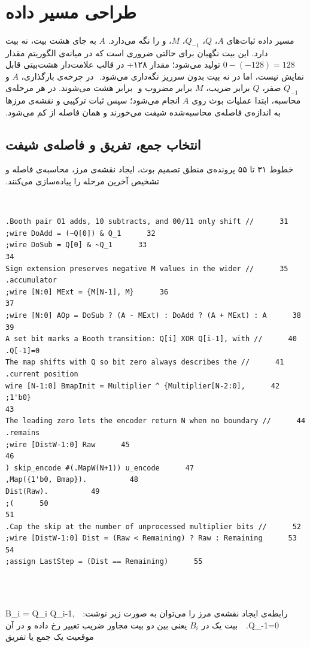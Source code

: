 ‫
‫
‫\section{طراحی مسیر داده}
‫
‫مسیر داده ثبات‌های $A$، $Q$، $Q_{-1}$، $M$،  و  را نگه
‫می‌دارد. $A$ به جای هشت بیت، نه بیت دارد. این بیت نگهبان برای حالتی ضروری است که در
‫میانه‌ی الگوریتم مقدار $0-(-128)=128$ تولید می‌شود؛ مقدار ۱۲۸+ در قالب علامت‌دار هشت‌بیتی
‫قابل نمایش نیست، اما در نه بیت بدون سرریز نگه‌داری می‌شود.
‫
‫در چرخه‌ی بارگذاری، $A$ و $Q_{-1}$ صفر، $Q$ برابر ضریب، $M$ برابر مضروب و
‫ برابر هشت می‌شوند. در هر مرحله‌ی محاسبه، ابتدا عملیات بوث روی $A$ انجام
‫می‌شود؛ سپس ثبات ترکیبی و نقشه‌ی مرزها به اندازه‌ی فاصله‌ی محاسبه‌شده شیفت می‌خورند و همان
‫فاصله از  کم می‌شود.
‫
‫
‫\subsection{انتخاب جمع، تفریق و فاصله‌ی شیفت}
‫
‫خطوط ۳۱ تا ۵۵ پرونده‌ی  منطق تصمیم بوث، ایجاد نقشه‌ی مرز، محاسبه‌ی
‫فاصله و تشخیص آخرین مرحله را پیاده‌سازی می‌کنند.
‫
‫\begin{dsdlcodeblock}
‫\begin{verbatim}
‫31      // Booth pair 01 adds, 10 subtracts, and 00/11 only shift.
‫32      wire DoAdd = (~Q[0]) & Q_1;
‫33      wire DoSub = Q[0] & ~Q_1;
‫34
‫35      // Sign extension preserves negative M values in the wider accumulator.
‫36      wire [N:0] MExt = {M[N-1], M};
‫37
‫38      wire [N:0] AOp = DoSub ? (A - MExt) : DoAdd ? (A + MExt) : A;
‫39
‫40      // A set bit marks a Booth transition: Q[i] XOR Q[i-1], with Q[-1]=0.
‫41      // The map shifts with Q so bit zero always describes the current position.
‫42      wire [N-1:0] BmapInit = Multiplier ^ {Multiplier[N-2:0], 1'b0};
‫43
‫44      // The leading zero lets the encoder return N when no boundary remains.
‫45      wire [DistW-1:0] Raw;
‫46
‫47      skip_encode #(.MapW(N+1)) u_encode (
‫48          .Map({1'b0, Bmap}),
‫49          .Dist(Raw)
‫50      );
‫51
‫52      // Cap the skip at the number of unprocessed multiplier bits.
‫53      wire [DistW-1:0] Dist = (Raw < Remaining) ? Raw : Remaining;
‫54
‫55      assign LastStep = (Dist == Remaining);
‫\end{verbatim}
‫\end{dsdlcodeblock}
‫
‫رابطه‌ی ایجاد نقشه‌ی مرز را می‌توان به صورت زیر نوشت:
‫
‫
‫B_i = Q_i \oplus Q_{i-1}, \qquad Q_{-1}=0.
‫
‫
‫بیت یک در $B_i$ یعنی بین دو بیت مجاور ضریب تغییر رخ داده و در آن موقعیت یک جمع یا تفریق
